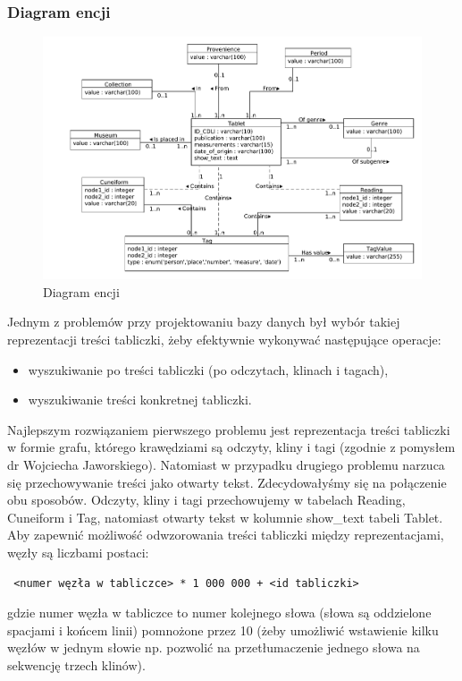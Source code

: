\documentclass{pracamgr}
\begin{document}
\subsubsection{Diagram encji}
\begin{figure}[h]
 \centering
 \includegraphics[width=500px,bb=0 0 930 560]{./diagramy/diagram-encji-maly.pdf}
 \caption{Diagram encji}
\end{figure}
Jednym z problemów przy projektowaniu bazy danych był wybór takiej reprezentacji treści tabliczki, żeby efektywnie wykonywać następujące operacje:
\begin{itemize}
 \item wyszukiwanie po treści tabliczki (po odczytach, klinach i tagach),
\item wyszukiwanie treści konkretnej tabliczki.
\end{itemize}
Najlepszym rozwiązaniem pierwszego problemu jest reprezentacja treści tabliczki
w formie grafu,
 którego krawędziami są odczyty, kliny i tagi (zgodnie z pomysłem dr Wojciecha Jaworskiego\cite[s.13-24]{jaworski}).
Natomiast w przypadku drugiego problemu narzuca się przechowywanie treści
jako otwarty tekst.
Zdecydowałyśmy się na połączenie obu sposobów. Odczyty, kliny i tagi przechowujemy w tabelach Reading, Cuneiform i Tag, 
natomiast otwarty tekst w kolumnie show\_text tabeli Tablet.
Aby zapewnić możliwość odwzorowania treści tabliczki między reprezentacjami, węzły są liczbami postaci:
\begin{verbatim}
 <numer węzła w tabliczce> * 1 000 000 + <id tabliczki>
\end{verbatim}
gdzie numer węzła w tabliczce to numer kolejnego słowa (słowa są oddzielone spacjami i końcem linii) pomnożone przez 10 (żeby umożliwić
wstawienie kilku węzłów w jednym słowie np. pozwolić na przetłumaczenie jednego słowa na sekwencję trzech klinów). 
\end{document}
